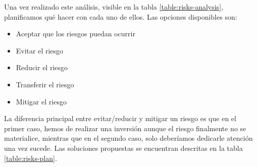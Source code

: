 \documentclass[openright,twoside,12pt]{book}
\begin{document}
Una vez realizado este análisis, visible en la tabla \ref{table:risks-analysis}, planificamos qué hacer con cada uno de ellos. Las opciones disponibles son:

\begin{itemize}
    \item Aceptar que los riesgos puedan ocurrir
    \item Evitar el riesgo
    \item Reducir el riesgo
    \item Transferir el riesgo
    \item Mitigar el riesgo
\end{itemize}

La diferencia principal entre evitar/reducir y mitigar un riesgo es que en el primer caso, hemos de realizar una inversión aunque el riesgo finalmente no se materialice, mientras que en el segundo caso, solo deberíamos dedicarle atención una vez sucede. Las soluciones propuestas se encuentran descritas en la tabla \ref{table:risks-plan}.
\end{document}
